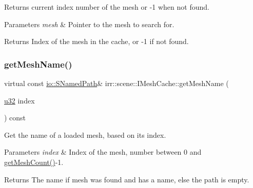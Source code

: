 Returns current index number of the mesh or -\/1 when not found. 


\begin{DoxyParams}{Parameters}
{\em mesh} & Pointer to the mesh to search for. \\
\hline
\end{DoxyParams}
\begin{DoxyReturn}{Returns}
Index of the mesh in the cache, or -\/1 if not found. 
\end{DoxyReturn}
\mbox{\label{classirr_1_1scene_1_1IMeshCache_af06efb8fb21f6bba16e52d879b5d3ddd}} 
\subsubsection{\texorpdfstring{get\+Mesh\+Name()}{getMeshName()}\hspace{0.1cm}{\footnotesize\ttfamily [1/4]}}
{\footnotesize\ttfamily virtual const \hyperlink{structirr_1_1io_1_1SNamedPath}{io\+::\+S\+Named\+Path}\& irr\+::scene\+::\+I\+Mesh\+Cache\+::get\+Mesh\+Name (\begin{DoxyParamCaption}\item[{\hyperlink{namespaceirr_a0416a53257075833e7002efd0a18e804}{u32}}]{index }\end{DoxyParamCaption}) const\hspace{0.3cm}{\ttfamily [pure virtual]}}



Get the name of a loaded mesh, based on its index. 


\begin{DoxyParams}{Parameters}
{\em index} & Index of the mesh, number between 0 and \hyperlink{classirr_1_1scene_1_1IMeshCache_a9dc99e46309a6ef494ef7672c9b49853}{get\+Mesh\+Count()}-\/1. \\
\hline
\end{DoxyParams}
\begin{DoxyReturn}{Returns}
The name if mesh was found and has a name, else the path is empty. 
\end{DoxyReturn}
\mbox{\label{classirr_1_1scene_1_1IMeshCache_af06efb8fb21f6bba16e52d879b5d3ddd}} 
